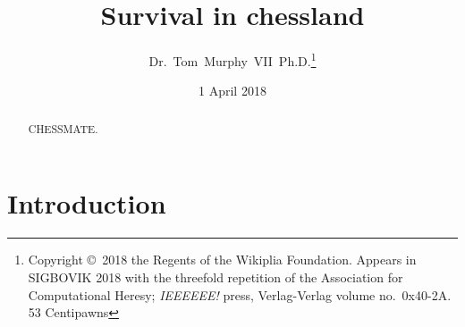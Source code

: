 \documentclass[twocolumn]{article}
\begin{document}
 

\title{Survival in chessland}
\author{Dr.~Tom~Murphy~VII~Ph.D.\thanks{
Copyright \copyright\ 2018 the Regents of the Wikiplia
Foundation. Appears in SIGBOVIK 2018 with the threefold
repetition of the Association for Computational Heresy; 
{\em IEEEEEE!} press, Verlag-Verlag volume no.~0x40-2A.
53 Centipawns} }


\newcommand\checkmate{\hspace{-.05em}\raisebox{.4ex}{\tiny\bf ++}}

\renewcommand\th{\ensuremath{{}^{\textrm{th}}}}
\newcommand\st{\ensuremath{{}^{\textrm{st}}}}
\newcommand\rd{\ensuremath{{}^{\textrm{rd}}}}
\newcommand\nd{\ensuremath{{}^{\textrm{nd}}}}
\newcommand\at{\ensuremath{\scriptstyle @}}

\date{1 April 2018}

\maketitle \thispagestyle{empty}

\begin{abstract}
CHESSMATE.
\end{abstract}

\section*{Introduction}
\end{document}
